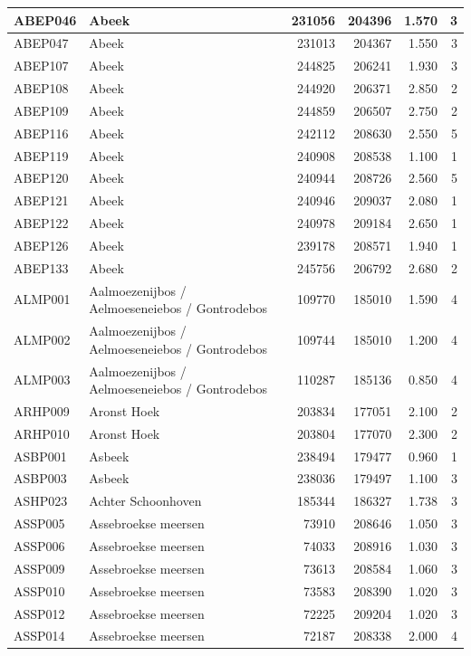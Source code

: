 \documentclass[11pt,]{book}
\begin{document}
\begin{table}
\begin{tabular}[t]{l|l|r|r|r|r}
\hline
ABEP046 & Abeek & 231056 & 204396 & 1.570 & 3\\
\hline
ABEP047 & Abeek & 231013 & 204367 & 1.550 & 3\\
\hline
ABEP107 & Abeek & 244825 & 206241 & 1.930 & 3\\
\hline
ABEP108 & Abeek & 244920 & 206371 & 2.850 & 2\\
\hline
ABEP109 & Abeek & 244859 & 206507 & 2.750 & 2\\
\hline
ABEP116 & Abeek & 242112 & 208630 & 2.550 & 5\\
\hline
ABEP119 & Abeek & 240908 & 208538 & 1.100 & 1\\
\hline
ABEP120 & Abeek & 240944 & 208726 & 2.560 & 5\\
\hline
ABEP121 & Abeek & 240946 & 209037 & 2.080 & 1\\
\hline
ABEP122 & Abeek & 240978 & 209184 & 2.650 & 1\\
\hline
ABEP126 & Abeek & 239178 & 208571 & 1.940 & 1\\
\hline
ABEP133 & Abeek & 245756 & 206792 & 2.680 & 2\\
\hline
ALMP001 & Aalmoezenijbos / Aelmoeseneiebos / Gontrodebos & 109770 & 185010 & 1.590 & 4\\
\hline
ALMP002 & Aalmoezenijbos / Aelmoeseneiebos / Gontrodebos & 109744 & 185010 & 1.200 & 4\\
\hline
ALMP003 & Aalmoezenijbos / Aelmoeseneiebos / Gontrodebos & 110287 & 185136 & 0.850 & 4\\
\hline
ARHP009 & Aronst Hoek & 203834 & 177051 & 2.100 & 2\\
\hline
ARHP010 & Aronst Hoek & 203804 & 177070 & 2.300 & 2\\
\hline
ASBP001 & Asbeek & 238494 & 179477 & 0.960 & 1\\
\hline
ASBP003 & Asbeek & 238036 & 179497 & 1.100 & 3\\
\hline
ASHP023 & Achter Schoonhoven & 185344 & 186327 & 1.738 & 3\\
\hline
ASSP005 & Assebroekse meersen & 73910 & 208646 & 1.050 & 3\\
\hline
ASSP006 & Assebroekse meersen & 74033 & 208916 & 1.030 & 3\\
\hline
ASSP009 & Assebroekse meersen & 73613 & 208584 & 1.060 & 3\\
\hline
ASSP010 & Assebroekse meersen & 73583 & 208390 & 1.020 & 3\\
\hline
ASSP012 & Assebroekse meersen & 72225 & 209204 & 1.020 & 3\\
\hline
ASSP014 & Assebroekse meersen & 72187 & 208338 & 2.000 & 4\\

\end{tabular}
\end{table}
\end{document}
